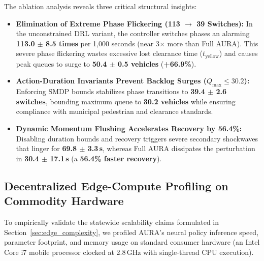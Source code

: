 \begin{table}[t]
\centering
\caption{Component Ablation Study Across 5 Random Seeds ($\mu \pm \sigma$)}
\label{tab:ablation}
\end{table}

The ablation analysis reveals three critical structural insights:
\begin{itemize}
    \item \textbf{Elimination of Extreme Phase Flickering (113 $\to$ 39 Switches):} In the unconstrained DRL variant, the controller switches phases an alarming \textbf{113.0 $\pm$ 8.5 times} per 1,000 seconds (near 3$\times$ more than Full AURA). This severe phase flickering wastes excessive lost clearance time ($t_{\text{yellow}}$) and causes peak queues to surge to \textbf{50.4 $\pm$ 0.5 vehicles} (\textbf{+66.9\%}).
    \item \textbf{Action-Duration Invariants Prevent Backlog Surges ($Q_{\max} \le 30.2$):} Enforcing SMDP bounds stabilizes phase transitions to \textbf{39.4 $\pm$ 2.6 switches}, bounding maximum queue to \textbf{30.2 vehicles} while ensuring compliance with municipal pedestrian and clearance standards.
    \item \textbf{Dynamic Momentum Flushing Accelerates Recovery by 56.4\%:} Disabling duration bounds and recovery triggers severe secondary shockwaves that linger for \textbf{69.8 $\pm$ 3.3\,s}, whereas Full AURA dissipates the perturbation in \textbf{30.4 $\pm$ 17.1\,s} (a \textbf{56.4\% faster recovery}).
\end{itemize}

\subsection{Decentralized Edge-Compute Profiling on Commodity Hardware}
To empirically validate the statewide scalability claims formulated in Section~\ref{sec:edge_complexity}, we profiled AURA's neural policy inference speed, parameter footprint, and memory usage on standard consumer hardware (an Intel Core i7 mobile processor clocked at 2.8\,GHz with single-thread CPU execution).

